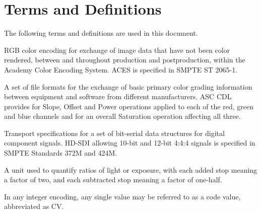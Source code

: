 \numberedformat
\chapter{Terms and Definitions}
The following terms and definitions are used in this document.

RGB color encoding for exchange of image data that have not been color rendered, between and throughout production and postproduction, within the Academy Color Encoding System. ACES is specified in SMPTE ST 2065-1.

A set of file formats for the exchange of basic primary color grading information between equipment and software from different manufacturers. ASC CDL provides for Slope, Offset and Power operations applied to each of the red, green and blue channels and for an overall Saturation operation affecting all three.

Transport specifications for a set of bit-serial data structures for digital component signals. HD-SDI allowing 10-bit and 12-bit 4:4:4 signals is specified in SMPTE Standards 372M and 424M.

A unit used to quantify ratios of light or exposure, with each added stop meaning a factor of two, and each subtracted stop meaning a factor of one-half.

In any integer encoding, any single value may be referred to as a code value, abbreviated as CV.
